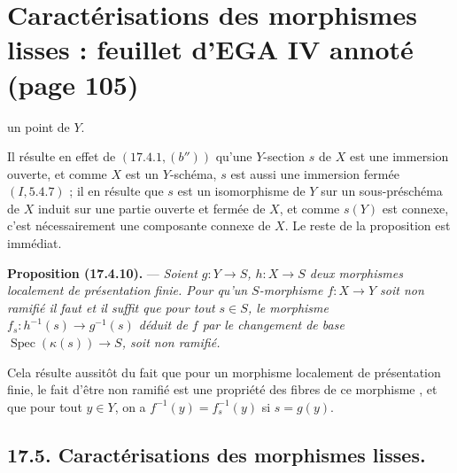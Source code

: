 \documentclass[11pt,a4paper]{article}
\begin{document}

\section*{Caractérisations des morphismes lisses : feuillet d'EGA IV annoté (page 105)}


un point de $Y$.

Il résulte en effet de $(17.4.1,(b''))$ qu'une $Y$-section $s$ de $X$ est une
immersion ouverte, et comme $X$ est un $Y$-schéma, $s$ est aussi une
\struck{\ill{}} immersion fermée $(I, 5.4.7)$ ; il en résulte que $s$ est un
isomorphisme de $Y$ sur un sous-préschéma de $X$ induit sur une partie ouverte
et fermée de $X$, et comme $s(Y)$ est connexe, c'est nécessairement une
composante connexe de $X$. Le reste de la proposition est immédiat.

\textbf{Proposition (17.4.10).} --- \emph{Soient $g : Y \to S$, $h : X \to S$
deux morphismes localement de présentation finie. Pour qu'un $S$-morphisme $f :
X \to Y$ soit non ramifié il faut et il suffit que pour tout $s \in S$, le
morphisme $f_{s} : h^{-1}(s) \to g^{-1}(s)$ déduit de $f$ par le changement de
base $\operatorname{Spec}(\kappa(s)) \to S$, soit non ramifié.}

Cela résulte aussitôt du fait que pour un morphisme localement de présentation
finie, le fait d'être non ramifié est une propriété des fibres de ce morphisme
, et que pour tout $y \in Y$, on a $f^{-1}(y) =
f_{s}^{-1}(y)$ si $s = g(y)$.

\subsection*{17.5. Caractérisations des morphismes lisses.}
\end{document}
